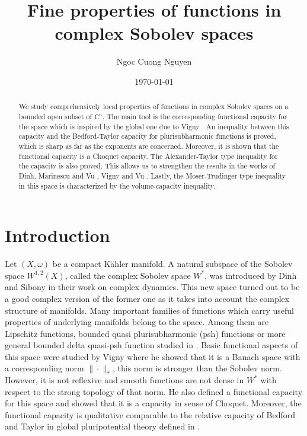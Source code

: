\documentclass{amsart}
\title{Fine properties of  functions in complex Sobolev spaces}
\author{Ngoc Cuong Nguyen}
\date{\today}
\newcommand{\om}{\omega}
\newcommand{\bC}{\mathbb{C}}
\theoremstyle{definition}
\numberwithin{thm}{section}
\numberwithin{equation}{section}
\renewcommand{\[}{\begin{equation}}
\renewcommand{\]}{\end{equation}}
\begin{document}
\maketitle
\begin{abstract} We study comprehensively local properties of functions in complex Sobolev spaces on a bounded open subset of $\bC^n$. The main tool is the corresponding functional capacity for  the space which is inspired by the global one due to Vigny \cite{Vigny}. An inequality between this capacity and the Bedford-Taylor capacity for plurisubharmonic functions is proved, which is sharp as far as the exponents are concerned. Moreover, it is shown that the functional capacity is a Choquet capacity. The Alexander-Taylor type inequality for the capacity is also proved.  This allows us to strengthen the results in  the works of Dinh, Marinescu and Vu \cite{DMV}, Vigny and Vu \cite{VV24}. Lastly, the Moser-Trudinger type inequality in this space is characterized by the volume-capacity inequality.
\end{abstract}


\tableofcontents

\section{Introduction}

Let $(X,\om)$ be a compact K\"ahler manifold.  A natural subspace of the Sobolev space $W^{1,2}(X)$, called the complex Sobolev space $W^*$, was introduced by Dinh and Sibony \cite{DS} in their work on complex dynamics. 
This new space turned out to be a good complex version of the former one as it takes into account the complex structure of manifolds. Many important families of functions which carry useful properties of underlying manifolds belong to the space. Among them are Lipschitz functions, bounded quasi plurisubharmonic (psh) functions or more general bounded delta quasi-psh function studied in  \cite{CW05}. Basic functional aspects of this space were studied by Vigny \cite{Vigny} where he showed that it is a Banach space with a corresponding norm $\| \cdot\|_*$, this norm  is stronger than the Sobolev norm. However, it is not reflexive and smooth functions are not dense in $W^*$ with respect to the strong topology of that norm.  He also defined a functional capacity for this space and showed that it is a capacity in sense of Choquet. Moreover, the functional capacity is qualitative comparable to the relative capacity of Bedford and Taylor in global pluripotential theory defined in  \cite{ko03}. 
\end{document}
